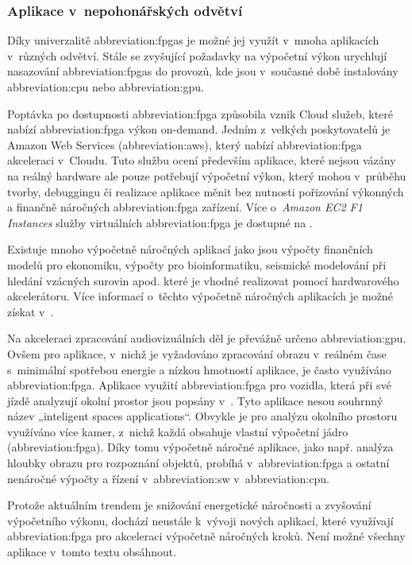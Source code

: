 \documentclass[a4paper, twoside, 11pt]{article}
\begin{document}
			\subsubsection{Aplikace v~nepohonářských odvětví}
				Díky univerzalitě \gls{abbreviation:fpgas} je možné jej využít v~mnoha aplikacích v~různých odvětví. Stále se zvyšující požadavky na výpočetní výkon urychlují nasazování \gls{abbreviation:fpgas} do provozů, kde jsou v~současné době instalovány \gls{abbreviation:cpu} nebo \gls{abbreviation:gpu}.\par
				Poptávka po dostupnosti \gls{abbreviation:fpga} způsobila vznik Cloud služeb, které nabízí \gls{abbreviation:fpga} výkon on-demand. Jedním z~velkých poskytovatelů je Amazon Web Services (\gls{abbreviation:aws}), který nabízí \gls{abbreviation:fpga} akceleraci v~Cloudu. Tuto službu ocení především aplikace, které nejsou vázány na reálný hardware ale pouze potřebují výpočetní výkon, který mohou v~průběhu tvorby, debuggingu či realizace aplikace měnit bez nutnosti pořizování výkonných a finančně náročných \gls{abbreviation:fpga} zařízení. Více o~\textit{Amazon EC2 F1 Instances} služby virtuálních \gls{abbreviation:fpga} je dostupné na \cite{amazon-ec2-f1}.\par
				Existuje mnoho výpočetně náročných aplikací jako jsou výpočty finančních modelů pro ekonomiku, výpočty pro bioinformatiku, seismické modelování při hledání vzácných surovin apod. které je vhodné realizovat pomocí hardwarového akcelerátoru. Více informací o~těchto výpočetně náročných aplikacích je možné získat v~\cite{wim-high-performance-computing-using-fpgas}.\par
				Na akceleraci zpracování audiovizuálních děl je převážně určeno \gls{abbreviation:gpu}. Ovšem pro aplikace, v~nichž je vyžadováno zpracování obrazu v~reálném čase s~minimální spotřebou energie a nízkou hmotností aplikace, je často využíváno \gls{abbreviation:fpga}. Aplikace využití \gls{abbreviation:fpga} pro vozidla, která při své jízdě analyzují okolní prostor jsou popsány v~\cite{andina-advanced-features-and-industrial-applications-of-fpga}. Tyto aplikace nesou souhrnný název „inteligent spaces applications“. Obvykle je pro analýzu okolního prostoru využíváno více kamer, z~nichž každá obsahuje vlastní výpočetní jádro (\gls{abbreviation:fpga}). Díky tomu výpočetně náročné aplikace, jako např. analýza hloubky obrazu pro rozpoznání objektů, probíhá v~\gls{abbreviation:fpga} a ostatní nenáročné výpočty a řízení v~\gls{abbreviation:sw} v~\gls{abbreviation:cpu}. \cite{andina-advanced-features-and-industrial-applications-of-fpga}\par
				Protože aktuálním trendem je snižování energetické náročnosti a zvyšování výpočetního výkonu, dochází neustále k~vývoji nových aplikací, které využívají \gls{abbreviation:fpga} pro akceleraci výpočetně náročných kroků. Není možné všechny aplikace v~tomto textu obsáhnout.
\end{document}

